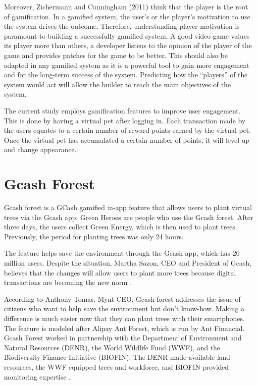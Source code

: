 Moreover, Zichermann and Cunningham (2011) think that the player is the root of
gamification. In a gamified system, the user’s or the player’s motivation to use
the system drives the outcome. Therefore, understanding player motivation is
paramount to building a successfully gamified system.
A good video game values its player more than others, a developer listens to the
opinion of the player of the game and provides patches for the game to be better.
This should also be adapted in any gamified system as it is a powerful tool to gain more engagement and for the long-term success of the system. Predicting how
the “players” of the system would act will allow the builder to reach the main
objectives of the system.

The current study employs gamification features to improve user engagement.
This is done by having a virtual pet after logging in. Each
transaction made by the users equates to a certain number of reward points earned
by the virtual pet. Once the virtual pet has accumulated a certain number of
points, it will level up and change appearance.

\section{Gcash Forest}

Gcash forest is a GCash gamified in-app feature that allows users to plant
virtual trees via the Gcash app. Green Heroes are people who use the Gcash
forest. After three days, the users collect Green Energy, which is then used to
plant trees. Previously, the period for planting trees was only 24 hours.

The feature helps save the environment through the Gcash app, which
has 20 million users. Despite the situation, Martha Sazon, CEO and President
of Gcash, believes that the changes will allow users to plant more trees because
digital transactions are becoming the new norm \cite{gabriel2020gcash}.

According to Anthony Tomas, Mynt CEO, Gcash forest addresses the issue of
citizens who want to help save the environment but don’t know-how. Making a
difference is much easier now that they can plant trees with their smartphones.
The feature is modeled after Alipay Ant Forest, which is run by Ant Financial.
Gcash Forest worked in partnership with the Department of Environment and
Natural Resources (DENR), the World Wildlife Fund (WWF), and the Biodiversity
Finance Initiative (BIOFIN). The DENR made available land resources, the
WWF equipped trees and workforce, and BIOFIN provided monitoring expertise \cite{adobo2019digital}.

